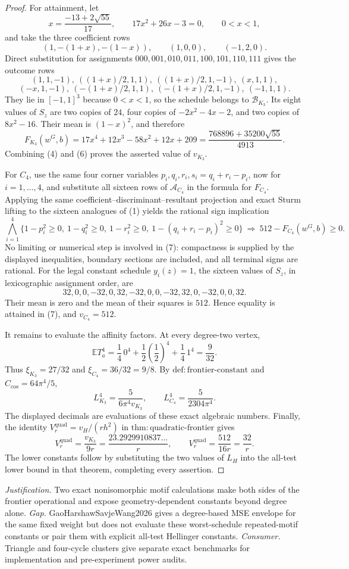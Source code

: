 \documentclass{article}
\begin{document}
\begin{proof}
For attainment, let
\[
x=\frac{-13+2\sqrt{55}}{17},\qquad 17x^2+26x-3=0,\qquad 0<x<1,
\]
and take the three coefficient rows
\[
(1,-(1+x),-(1-x)),\qquad (1,0,0),\qquad (-1,2,0).
\]
Direct substitution for assignments \(000,001,010,011,100,101,110,111\) gives the outcome rows
\[
 (1,1,-1),\ ((1+x)/2,1,1),\ ((1+x)/2,1,-1),\ (x,1,1),
\]
\[
 (-x,1,-1),\ (-(1+x)/2,1,1),\ (-(1+x)/2,1,-1),\ (-1,1,1).
\]
They lie in \([-1,1]^3\) because \(0<x<1\), so the schedule belongs to \(\mathcal B_{K_3}\).  Its eight values of \(S_z\) are two copies of \(24\), four copies of \(-2x^2-4x-2\), and two copies of \(8x^2-16\).  Their mean is \((1-x)^2\), and therefore
\[
F_{K_3}(w^G,b)=17x^4+12x^3-58x^2+12x+209
=\frac{768896+35200\sqrt{55}}{4913}. \tag{6}
\]
Combining (4) and (6) proves the asserted value of \(v_{K_3}\).

For \(C_4\), use the same four corner variables \(p_i,q_i,r_i,s_i=q_i+r_i-p_i\), now for \(i=1,\ldots,4\), and substitute all sixteen rows of \(\mathcal A_{C_4}\) in the formula for \(F_{C_4}\).  Applying the same coefficient--discriminant--resultant projection and exact Sturm lifting to the sixteen analogues of (1) yields the rational sign implication
\[
\bigwedge_{i=1}^4\{1-p_i^2\ge0,\ 1-q_i^2\ge0,\ 1-r_i^2\ge0,\ 1-(q_i+r_i-p_i)^2\ge0\}
\ \Longrightarrow\ 512-F_{C_4}(w^G,b)\ge0. \tag{7}
\]
No limiting or numerical step is involved in (7): compactness is supplied by the displayed inequalities, boundary sections are included, and all terminal signs are rational.  For the legal constant schedule \(y_i(z)=1\), the sixteen values of \(S_z\), in lexicographic assignment order, are
\[
32,0,0,-32,0,32,-32,0,0,-32,32,0,-32,0,0,32.
\]
Their mean is zero and the mean of their squares is \(512\).  Hence equality is attained in (7), and \(v_{C_4}=512\).

It remains to evaluate the affinity factors.  At every degree-two vertex,
\[
\mathbb E T_a^4=\frac14\,0^4+\frac12\left(\frac12\right)^4+\frac14\,1^4=\frac9{32}.
\]
Thus \(\xi_{K_3}=27/32\) and \(\xi_{C_4}=36/32=9/8\).  By \(\mathrm{def:frontier\text{-}constant}\) and \(C_{\cos}=64\pi^4/5\),
\[
L_{K_3}^4=\frac{5}{6\pi^4v_{K_3}},\qquad
L_{C_4}^4=\frac{5}{2304\pi^4}.
\]
The displayed decimals are evaluations of these exact algebraic numbers.  Finally, the identity \(V_r^{\mathrm{quad}}=v_H/(rh^2)\) in \(\mathrm{thm:quadratic\text{-}frontier}\) gives
\[
V_r^{\mathrm{quad}}=\frac{v_{K_3}}{9r}=\frac{23.2929910837\ldots}{r},\qquad
V_r^{\mathrm{quad}}=\frac{512}{16r}=\frac{32}{r}.
\]
The lower constants follow by substituting the two values of \(L_H\) into the all-test lower bound in that theorem, completing every assertion.
\end{proof}
\par\smallskip\noindent \textit{Justification.} Two exact nonisomorphic motif calculations make both sides of the frontier operational and expose geometry-dependent constants beyond degree alone. \textit{Gap.} GaoHarshawSavjeWang2026 gives a degree-based MSE envelope for the same fixed weight but does not evaluate these worst-schedule repeated-motif constants or pair them with explicit all-test Hellinger constants. \textit{Consumer.} Triangle and four-cycle clusters give separate exact benchmarks for implementation and pre-experiment power audits.
\end{document}

